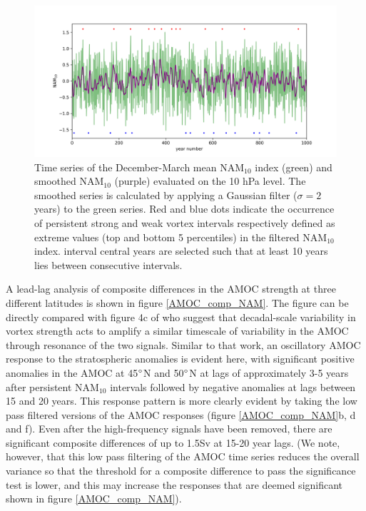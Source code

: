 \newpage
\begin{figure}[h!]
\begin{center}
\noindent\includegraphics[width = \linewidth]{Figures/Figures-surface/NAM_and_filtered.png} 
\caption[NAM$_{10}$ and Gaussian smoothed NAM$_{10}$ time series]{Time series of the December-March mean NAM$_{10}$ index (green) and smoothed NAM$_{10}$ (purple) evaluated on the 10 hPa level. The smoothed series is calculated by applying a Gaussian filter ($\sigma = 2$ years) to the green series. Red and blue dots indicate the occurrence of persistent strong and weak vortex intervals respectively defined as extreme values (top and bottom 5 percentiles) in the filtered NAM$_{10}$ index. interval central years are selected such that at least 10 years lies between consecutive intervals.}
\label{NAM_and_filtered}
\end{center}
\end{figure}

A lead-lag analysis of composite differences in the AMOC strength at three different latitudes is shown in figure \ref{AMOC_comp_NAM}. The figure can be directly compared with figure 4c of \cite{reichlerStratospheric2012b} who suggest that decadal-scale variability in vortex strength acts to amplify a similar timescale of variability in the AMOC through resonance of the two signals. Similar to that work, an oscillatory AMOC response to the stratospheric anomalies is evident here, with significant positive anomalies in the AMOC at 45$\degree$N and 50$\degree$N at lags of approximately 3-5 years after persistent NAM$_{10}$ intervals followed by negative anomalies at lags between 15 and 20 years. This response pattern is more clearly evident by taking the low pass filtered versions of the AMOC responses (figure \ref{AMOC_comp_NAM}b, d and f). Even after the high-frequency signals have been removed, there are significant composite differences of up to 1.5Sv at 15-20 year lags. (We note, however, that this low pass filtering of the AMOC time series reduces the overall variance so that the threshold for a composite difference to pass the significance test is lower, and this may increase the responses that are deemed significant shown in figure \ref{AMOC_comp_NAM}). 

